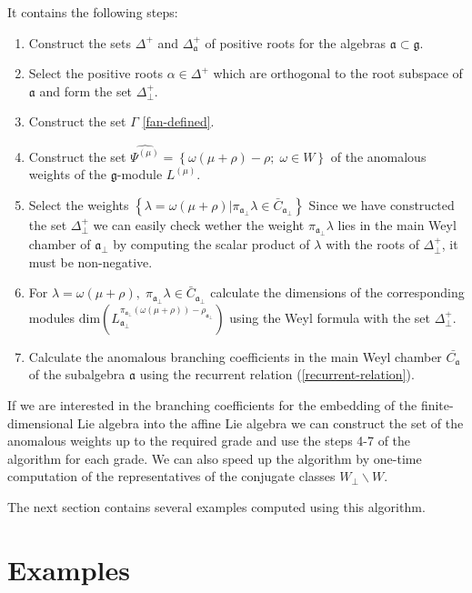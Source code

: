 \documentclass[a4paper,12pt]{article}
\theoremstyle{definition} \newtheorem{Def}{Definition}
\begin{document}
It contains the following steps:
\begin{enumerate}
\item Construct the sets $\Delta^{+}$ and $\Delta_{\mathfrak{a}}^{+}$ of positive roots for the algebras $\mathfrak{a} \subset \mathfrak{g}$.
\item Select the positive roots $\alpha\in \Delta^{+}$ which are orthogonal to the root subspace of $\mathfrak{a}$ and form the set $\Delta^{+}_{\bot}$.
\item Construct the set $\Gamma$ \eqref{fan-defined}.
\item Construct the set $\widehat{\Psi^{(\mu)}}=\left\{\omega(\mu+\rho)-\rho;\; \omega\in W\right\}$ of the anomalous weights of the $\mathfrak{g}$-module $L^{(\mu)}$.
\item Select the weights $\left\{ \lambda=\omega(\mu+\rho) | \pi_{\mathfrak{a}_{\bot}}\lambda \in \bar{C}_{\mathfrak{a}_{\bot}} \right\}$ Since we have constructed the set $\Delta^{+}_{\bot}$ we can easily check wether the weight $\pi_{\mathfrak{a}_{\bot}}\lambda$ lies in the main Weyl chamber of $\mathfrak{a}_{\bot}$ by computing the scalar product of $\lambda$ with the roots of $\Delta^{+}_{\bot}$, it must be non-negative.
\item For $\lambda=\omega(\mu+\rho),\; \pi_{\mathfrak{a}_{\bot}}\lambda\in \bar{C}_{\mathfrak{a}_{\bot}}$ calculate the dimensions of the corresponding modules $\mathrm{dim}\left(L^{\pi_{\mathfrak{a}_{\bot}}(\omega(\mu+\rho))-\rho_{\mathfrak{a}_{\bot}}}_{\mathfrak{a}_{\bot}}\right)$ using the Weyl formula with the set $\Delta^{+}_{\bot}$.
\item Calculate the anomalous branching coefficients in the main Weyl
  chamber $\bar{C_{\mathfrak{a}}}$ of the subalgebra $\mathfrak{a}$ using the recurrent relation (\ref{recurrent-relation}).
\end{enumerate}

If we are interested in the branching coefficients for the embedding of the finite-dimensional Lie algebra into the affine Lie algebra we can construct the set of the anomalous weights up to the required grade and use the steps 4-7 of the algorithm for each grade. We can also speed up the algorithm by one-time computation of the representatives of the conjugate classes $W_{\bot}\backslash W$.

The next section contains several examples computed using this algorithm.

\section{Examples}
\label{sec:examples}
\end{document}
